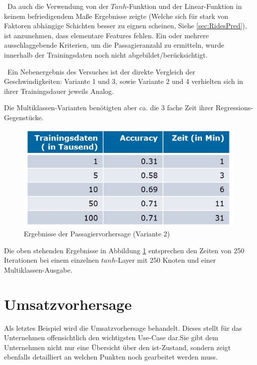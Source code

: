 ~\newline Da auch die Verwendung von der $Tanh$-Funktion und der Linear-Funktion in keinem befriedigendem Maße Ergebnisse zeigte (Welche sich für stark von Faktoren abhängige Schichten besser zu eignen scheinen, Siehe \ref{sec:RidesPred}), ist anzunehmen, dass elementare Features fehlen. Ein oder mehrere ausschlaggebende Kriterien, um die Passagieranzahl zu ermitteln, wurde innerhalb der Trainingsdaten noch nicht abgebildet/berücksichtigt. 

~\newline Ein Nebenergebnis des Versuches ist der direkte Vergleich der Geschwindigkeiten: Variante 1 und 3, sowie Variante 2 und 4 verhielten sich in ihrer Trainingsdauer jeweils Analog. 

Die Multiklassen-Varianten benötigten aber ca. die 3 fache Zeit ihrer Regressions-Gegenstücke.

\begin{figure}[h]
	\begin{center}
		\includegraphics[width=0.8\linewidth]{Bilder/PassagierErgebnisse}
		\caption[Ergebnisse der Passagiervorhersage]{Ergebnisse der Passagiervorhersage (Variante 2)}
		\label{fig:PasErg}
	\end{center}
\end{figure}
 
 
 Die oben stehenden Ergebnisse in Abbildung \ref{fig:PasErg} entsprechen den Zeiten von 250 Iterationen bei einem einzelnen $tanh$-Layer mit 250 Knoten und einer Multiklassen-Ausgabe. 
\newpage
\section{Umsatzvorhersage}
\label{sec:RevPred}
Als letztes Beispiel wird die Umsatzvorhersage behandelt. Dieses stellt für das Unternehmen offensichtlich den wichtigsten Use-Case dar.Sie gibt dem Unternehmen nicht nur eine Übersicht über den ist-Zustand, sondern zeigt ebenfalls detailliert an welchen Punkten noch gearbeitet werden muss. 

